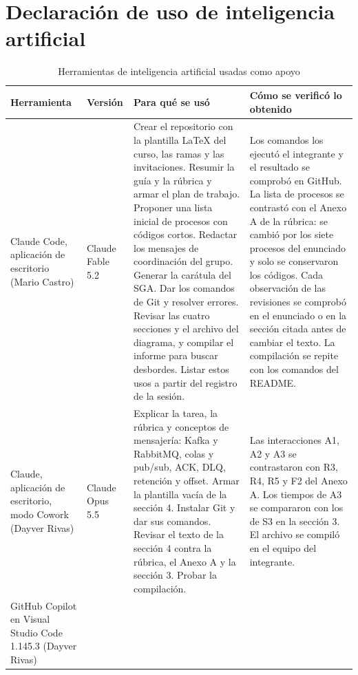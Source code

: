 \section{Declaración de uso de inteligencia artificial}

\begin{table}[H]
  \centering
  \footnotesize
  \caption{Herramientas de inteligencia artificial usadas como apoyo}
  \label{tab:declaracion-ia}
  \begin{tabularx}{\textwidth}{@{}>{\raggedright\arraybackslash}p{2.5cm}>{\raggedright\arraybackslash}p{1.7cm}>{\raggedright\arraybackslash}X>{\raggedright\arraybackslash}X@{}}
    \toprule
    \textbf{Herramienta} & \textbf{Versión} & \textbf{Para qué se usó} & \textbf{Cómo se verificó lo obtenido} \\
    \midrule
    Claude Code, aplicación de escritorio (Mario Castro) &
    Claude Fable 5.2 &
    Crear el repositorio con la plantilla LaTeX del curso, las ramas y las
    invitaciones. Resumir la guía y la rúbrica y armar el plan de trabajo.
    Proponer una lista inicial de procesos con códigos cortos. Redactar los
    mensajes de coordinación del grupo. Generar la carátula del SGA. Dar los
    comandos de Git y resolver errores. Revisar las cuatro secciones y el
    archivo del diagrama, y compilar el informe para buscar desbordes.
    Listar estos usos a partir del registro de la sesión. &
    Los comandos los ejecutó el integrante y el resultado se comprobó en
    GitHub. La lista de procesos se contrastó con el Anexo A de la rúbrica:
    se cambió por los siete procesos del enunciado y solo se conservaron los
    códigos. Cada observación de las revisiones se comprobó en el enunciado
    o en la sección citada antes de cambiar el texto. La compilación se
    repite con los comandos del README. \\
    \addlinespace
    Claude, aplicación de escritorio, modo Cowork (Dayver Rivas) &
    Claude Opus 5.5 &
    Explicar la tarea, la rúbrica y conceptos de mensajería: Kafka y
    RabbitMQ, colas y pub/sub, ACK, DLQ, retención y offset. Armar la
    plantilla vacía de la sección 4. Instalar Git y dar sus comandos.
    Revisar el texto de la sección 4 contra la rúbrica, el Anexo A y la
    sección 3. Probar la compilación. &
    Las interacciones A1, A2 y A3 se contrastaron con R3, R4, R5 y F2 del
    Anexo A. Los tiempos de A3 se compararon con los de S3 en la sección 3.
    El archivo se compiló en el equipo del integrante. \\
    \addlinespace
    GitHub Copilot en Visual Studio Code 1.145.3 (Dayver Rivas) &

\end{tabularx}
\end{table}
